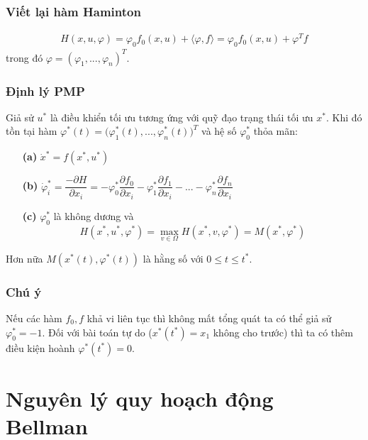\documentclass[12pt,a4paper]{report}
\begin{document}
	\subsubsection{Viết lại hàm Haminton}
	\begin{eqnarray}
		H(x, u, \varphi) = \varphi_0f_0(x, u) + \langle \varphi, f \rangle = \varphi_0f_0(x, u) + \varphi^Tf 
	\end{eqnarray} trong đó $\varphi = (\varphi_1,...,\varphi_n)^T$.
	
	\subsubsection{Định lý PMP} Giả sử $u^*$ là điều khiển tối ưu tương ứng với quỹ đạo trạng thái tối ưu $x^*$. Khi đó tồn tại hàm $\varphi^*(t) = \big(\varphi_1^*(t),..., \varphi_n^*(t)\big)^T$ và hệ số $\varphi_0^*$ thỏa mãn:
	\begin{itemize}
		\item[\textbf{(a)}] $\dot{x}^* = f(x^*, u^*)$
		\item[\textbf{(b)}] $\dot{\varphi}_i^* = \dfrac{-\partial H}{\partial x_i} = -\varphi_0^*\dfrac{\partial f_0}{\partial x_i} - \varphi_1^*\dfrac{\partial f_1}{\partial x_i} - ... - \varphi_n^*\dfrac{\partial f_n}{\partial x_i}$
		\item[\textbf{(c)}]$\varphi_0^*$ là không dương và $$H(x^*, u^*, \varphi^*) = \max_{v\in \Omega}H(x^*, v, \varphi^*) = M(x^*, \varphi^*)$$
	\end{itemize} Hơn nữa $M(x^*(t), \varphi^*(t))$ là hằng số với $0 \leq t \leq t^*$. \subsubsection{Chú ý} Nếu các hàm $f_0, f$ khả vi liên tục thì không mất tổng quát ta có thể giả sử $\varphi_0^* = -1$. Đối với bài toán tự do ($x^*(t^*) = x_1$ không cho trước) thì ta có thêm điều kiện hoành $\varphi^*(t^*) = 0$.

\section{Nguyên lý quy hoạch động Bellman}
\end{document}
